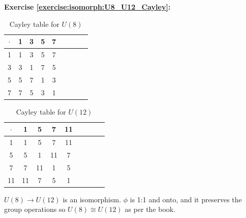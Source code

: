 \noindent\textbf{Exercise \ref{exercise:isomorph:U8_U12_Cayley}:}
\begin{multicols}{2}

\begin{table}[H]
\caption{Cayley table for $U(8)$}
{\small
\begin{center}
\begin{tabular}{c|cccccccc}
$\cdot$ & 1 & 3 & 5 & 7  \\
\hline
1        & 1 & 3 & 5 & 7  \\
3       & 3 & 1 & 7 & 5  \\
5       & 5 & 7 & 1 & 3 \\
7       & 7 & 5 & 3 & 1 \\
\end{tabular}
\end{center}
}
\end{table}

\begin{table}[H]
\caption{Cayley table for $U(12)$}
{\small
\begin{center}
\begin{tabular}{c|cccccccc}
$\cdot$ & 1 & 5 & 7 & 11  \\
\hline
1        & 1 & 5 & 7 & 11  \\
5       & 5 & 1 & 11 & 7 \\
7       & 7 & 11 & 1 & 5  \\
11      & 11 & 7 & 5 & 1 \\
\end{tabular}
\end{center}
}
\end{table}
\end{multicols}
\noindent $U(8)  \rightarrow U(12)$ is an isomorphism.  $\phi$ is 1:1 and onto, and it preserves the group operations so $U(8) \cong U(12)$ as per the book. 
\\
\\

